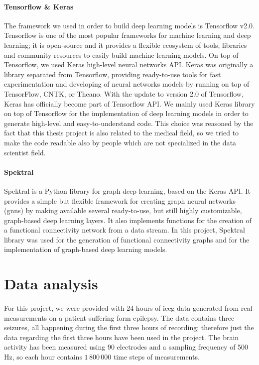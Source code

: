 \paragraph{Tensorflow \& Keras} \cite{tensorflow} \cite{keras} The framework we used in order to build deep learning models is Tensorflow v2.0. Tensorflow is one of the most popular frameworks for machine learning and deep learning; it is open-source and it provides a flexible ecosystem of tools, libraries and community resources to easily build machine learning models. On top of Tensorflow, we used Keras high-level neural networks API. Keras was originally a library separated from Tensorflow, providing ready-to-use tools for fast experimentation and developing of neural networks models by running on top of TensorFlow, CNTK, or Theano. With the update to version 2.0 of Tensorflow, Keras has officially become part of Tensorflow API. We mainly used Keras library on top of Tensorflow for the implementation of deep learning models in order to generate high-level and easy-to-understand code. This choice was reasoned by the fact that this thesis project is also related to the medical field, so we tried to make the code readable also by people which are not specialized in the data scientist field.

\paragraph{Spektral} \cite{Spektral} Spektral is a Python library for graph deep learning, based on the Keras API. It provides a simple but flexible framework for creating graph neural networks (\acsp{gnn}) by making available several ready-to-use, but still highly customizable, graph-based deep learning layers. It also implements functions for the creation of a functional connectivity network from a data stream. In this project, Spektral library was used for the generation of functional connectivity graphs and for the implementation of graph-based deep learning models.



\section{Data analysis} \label{sec: data_analysis}

\paragraph{} For this project, we were provided with 24 hours of \acs{ieeg} data generated from real measurements on a patient suffering form epilepsy. The data contains three seizures, all happening during the first three hours of recording; therefore just the data regarding the first three hours have been used in the project. The brain activity has been measured using 90 electrodes and a sampling frequency of 500 Hz, so each hour contains $1\,800\,000$ time steps of measurements.

